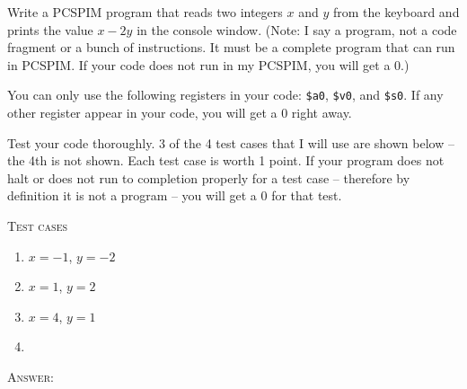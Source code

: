 

\renewcommand\AUTHOR{aoro1@cougars.ccis.edu} %


\topmattertwo


\nextq
Write a PCSPIM program that reads two integers $x$ and $y$ from the keyboard 
and prints the value $x - 2y$ in the console window. 
(Note: I say a program, not a code fragment or a bunch of instructions.
It must be a complete program that can run in PCSPIM.
If your code does not run in my PCSPIM, you will get a 0.)

You can only use the following registers in your code:
\verb!$a0!, \verb!$v0!, and \verb!$s0!.
If any other register appear in your code, you will get a 0 right away.

Test your code thoroughly. 3 of the 4 test cases that I will use
are shown below -- the 4th is not shown.
Each test case is worth 1 point.
If your program does not halt or does not run to completion properly
for a test case -- therefore by definition it is not a program --
 you will get a 0 for that test.

\textsc{Test cases}
\begin{enumerate}[nosep]
\item $x = -1$, $y = -2$
\item $x = 1$, $y = 2$
\item $x = 4$, $y = 1$
\item 
\end{enumerate}

\textsc{Answer:}
\begin{answercode}

\end{answercode}


\newpage


